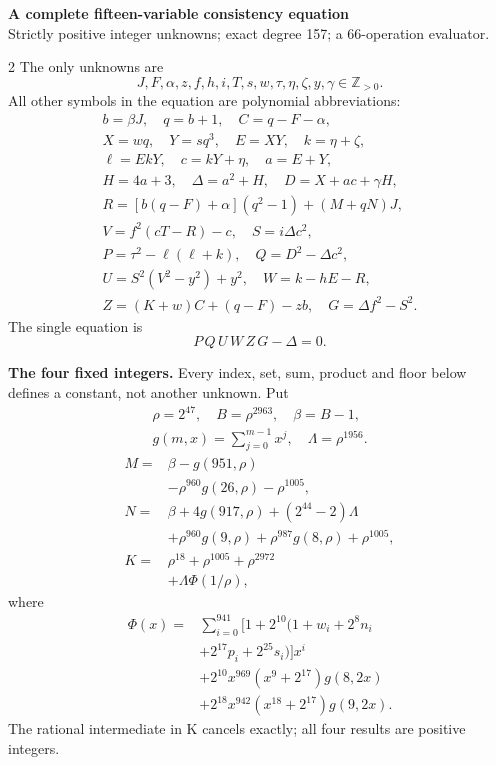 \documentclass[10pt]{article}
\begin{document}
\begin{center}
{\large\bfseries A complete fifteen-variable consistency equation}\\[-1pt]
{\small Strictly positive integer unknowns; exact degree 157; a 66-operation evaluator.}
\end{center}\vspace{-8pt}
\begin{multicols}{2}
\fontsize{9}{9.5}\selectfont
The only unknowns are
\[
J,F,\alpha,z,f,h,i,T,s,w,\tau,\eta,\zeta,y,\gamma\in\mathbb Z_{>0}.
\]
All other symbols in the equation are polynomial abbreviations:
\[
\begin{gathered}
b=\beta J,\quad q=b+1,\quad C=q-F-\alpha,\\
X=wq,\quad Y=sq^3,\quad E=XY,\quad k=\eta+\zeta,\\
\ell=EkY,\quad c=kY+\eta,\quad a=E+Y,\\
H=4a+3,\quad\Delta=a^2+H,\quad D=X+ac+\gamma H,\\
R=[b(q-F)+\alpha](q^2-1)+(M+qN)J,\\
V=f^2(cT-R)-c,\quad S=i\Delta c^2,\\
P=\tau^2-\ell(\ell+k),\quad Q=D^2-\Delta c^2,\\
U=S^2(V^2-y^2)+y^2,\quad W=k-hE-R,\\
Z=(K+w)C+(q-F)-zb,\quad G=\Delta f^2-S^2.
\end{gathered}
\]
The single equation is
\[
\boxed{P\,Q\,U\,W\,Z\,G-\Delta=0.}
\]

\textbf{The four fixed integers.}
Every index, set, sum, product and floor below defines a constant, not
another unknown. Put
\[
\begin{gathered}
\rho=2^{47},\quad B=\rho^{2963},\quad\beta=B-1,\\
g(m,x)=\sum_{j=0}^{m-1}x^j,\quad
\Lambda=\rho^{1956}.
\end{gathered}
\]
\begin{align*}
M={}&\beta-g(951,\rho)\\
&-\rho^{960}g(26,\rho)-\rho^{1005},\\
N={}&\beta+4g(917,\rho)+(2^{44}-2)\Lambda\\
&+\rho^{960}g(9,\rho)+\rho^{987}g(8,\rho)
  +\rho^{1005},\\
K={}&\rho^{18}+\rho^{1005}+\rho^{2972}\\
&+\Lambda\Phi(1/\rho),
\end{align*}
where
\[
\begin{split}
\Phi(x)={}&\sum_{i=0}^{941}[1+2^{10}(1+w_i+2^8n_i\\
&+2^{17}p_i+2^{25}s_i)]x^i\\
&+2^{10}x^{969}(x^9+2^{17})g(8,2x)\\
&+2^{18}x^{942}(x^{18}+2^{17})g(9,2x).
\end{split}
\]
The rational intermediate in K cancels exactly; all four results are positive integers.


\end{multicols}
\end{document}
